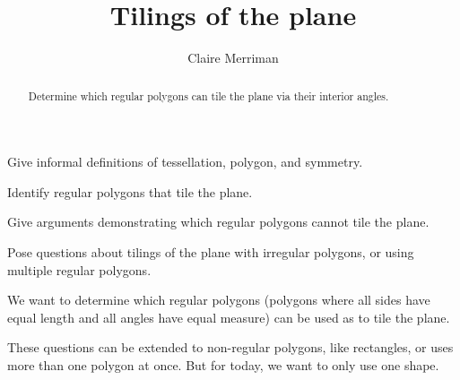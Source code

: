 \documentclass[noauthor,nooutcomes,handout]{ximera}
\title{Tilings of the plane}
\author{Claire Merriman}
\begin{document}
\begin{abstract}
Determine which regular polygons can tile the plane via their interior
angles.
\end{abstract}
\maketitle

\begin{listOutcomes}
\item Give informal definitions of tessellation, polygon, and
  symmetry.
\item Identify regular polygons that tile the plane.
\item Give arguments demonstrating which regular polygons cannot tile
  the plane.
\item Pose questions about tilings of the plane with irregular
  polygons, or using multiple regular polygons.
\end{listOutcomes}


We want to determine which regular polygons (polygons where all sides
have equal length and all angles have equal measure) can be used as to
tile the plane.
 
These questions can be extended to non-regular polygons, like
rectangles, or uses more than one polygon at once. But for today, we
want to only use one shape.

\mynewpage
\end{document}
